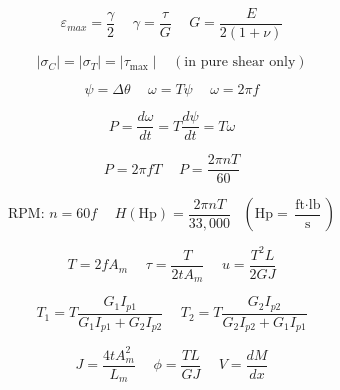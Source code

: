 \documentclass[twocolumn, 12pt]{article}
\begin{document}
{\begin{equation*}
    \varepsilon_{max} =\frac{\gamma}{2} \hspace{15pt} \gamma = \frac{\tau}{G} \hspace{15pt} G=\frac{E}{2(1+\nu)}
\end{equation*}

\begin{equation*}
     \mid \sigma_C \mid = \mid \sigma_T \mid = \mid \tau_{\text{max}} \mid \hspace{10pt} (\text{in pure shear only}) 
\end{equation*}

\begin{equation*}
    \psi =\Delta\theta \hspace{15pt} \omega =T \psi \hspace{15pt} \omega = 2\pi f
\end{equation*}

\begin{equation*}
    P=\frac{d \omega}{dt}=T \frac{d \psi}{dt} = T \omega
\end{equation*}

\begin{equation*}
    P = 2 \pi f T \hspace{15pt}  P=\frac{2\pi nT}{60}
\end{equation*}

\begin{equation*}
    \text{RPM}: \hspace{2pt} n = 60f \hspace{15pt} H(\text{Hp})=\frac{2\pi nT}{33,000} \hspace{10pt} \left(\text{Hp}=\frac{\text{ft} \cdot \text{lb}}{\text{s}}\right)
\end{equation*}

\begin{equation*}
    T=2fA_m \hspace{15pt} \tau=\frac{T}{2tA_m}  \hspace{15pt} u=\frac{T^2L}{2GJ}
\end{equation*}

\begin{equation*}
    T_1 = T \frac{G_1I_{p1}}{G_1I_{p1} + G_2I_{p2}} \hspace{15pt}  T_2 =T \frac{G_2I_{p2}}{G_2I_{p2}+G_1I_{p1}}
\end{equation*}

\begin{equation*}
    J=\frac{4tA_m^2}{L_m}  \hspace{15pt} \phi =\frac{TL}{GJ} \hspace{15pt} V=\frac{dM}{dx}
\end{equation*}

}
\end{document}
